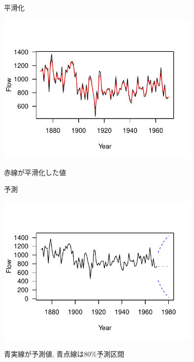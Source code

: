 \documentclass[dvipdfmx,12pt]{beamer}
\begin{document}
\begin{frame}{平滑化}
  \begin{center}
    \includegraphics[width=10cm]{dlm1_smooth}
  \end{center}

  赤線が平滑化した値
\end{frame}

\begin{frame}{予測}
  \begin{center}
    \includegraphics[width=10cm]{dlm1_predict}
  \end{center}

  青実線が予測値, 青点線は80\%予測区間
\end{frame}
\end{document}
